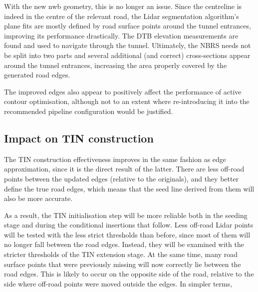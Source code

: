 With the new \ac{nwb} geometry, this is no longer an issue. Since the centreline is indeed in the centre of the relevant road, the Lidar segmentation algorithm's plane fits are mostly defined by road surface points around the tunnel entrances, improving its performance drastically. The DTB elevation measurements are found and used to navigate through the tunnel. Ultimately, the NBRS needs not be split into two parts and several additional (and correct) cross-sections appear around the tunnel entrances, increasing the area properly covered by the generated road edges.

The improved edges also appear to positively affect the performance of active contour optimisation, although not to an extent where re-introducing it into the recommended pipeline configuration would be justified.

\subsection{Impact on TIN construction}
\label{sub:nwb_updated_tinconstruction}

The TIN construction effectiveness improves in the same fashion as edge approximation, since it is the direct result of the latter. There are less off-road points between the updated edges (relative to the originals), and they better define the true road edges, which means that the seed line derived from them will also be more accurate.

As a result, the TIN initialisation step will be more reliable both in the seeding stage and during the conditional insertions that follow. Less off-road Lidar points will be tested with the less strict thresholds than before, since most of them will no longer fall between the road edges. Instead, they will be examined with the stricter thresholds of the TIN extension stage. At the same time, many road surface points that were previously missing will now correctly lie between the road edges. This is likely to occur on the opposite side of the road, relative to the side where off-road points were moved outside the edges. In simpler terms, 